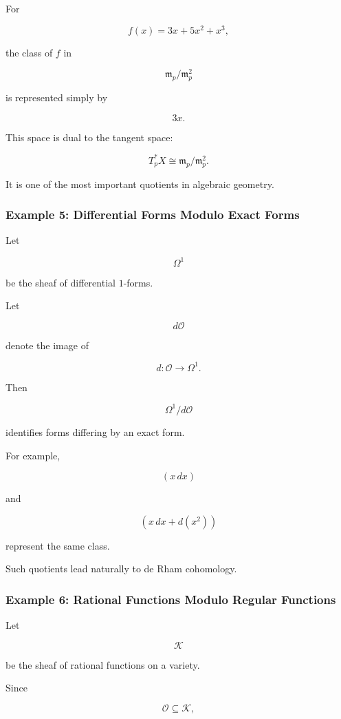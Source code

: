 \documentclass[12pt,a4paper]{article}
\theoremstyle{notespace}
\begin{document}
For

\[
f(x)=3x+5x^2+x^3,
\]

the class of \(f\) in

\[
\mathfrak m_p/\mathfrak m_p^2
\]

is represented simply by

\[
3x.
\]

This space is dual to the tangent space:

\[
T_p^*X
\cong
\mathfrak m_p/\mathfrak m_p^2.
\]

It is one of the most important quotients in algebraic geometry.

\bigskip

\subsubsection*{Example 5: Differential Forms Modulo Exact Forms}

Let

\[
\Omega^1
\]

be the sheaf of differential \(1\)-forms.

Let

\[
d\mathcal O
\]

denote the image of

\[
d:\mathcal O\to\Omega^1.
\]

Then

\[
\Omega^1/d\mathcal O
\]

identifies forms differing by an exact form.

For example,

\[
(x\,dx)
\]

and

\[
(x\,dx+d(x^2))
\]

represent the same class.

Such quotients lead naturally to de Rham cohomology.

\bigskip

\subsubsection*{Example 6: Rational Functions Modulo Regular Functions}

Let

\[
\mathcal K
\]

be the sheaf of rational functions on a variety.

Since

\[
\mathcal O\subseteq \mathcal K,
\]
\end{document}
